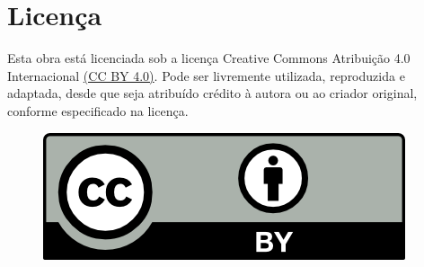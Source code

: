 \chapter{Licença}
Esta obra está licenciada sob a licença Creative Commons Atribuição 4.0 Internacional \href{https://creativecommons.org/licenses/by/4.0/deed.pt-br}{(CC BY 4.0)}. Pode ser livremente utilizada, reproduzida e adaptada, desde que seja atribuído crédito à autora ou ao criador original, conforme especificado na licença.
\begin{figure}[H]
    \centering
    \href{https://creativecommons.org/licenses/by/4.0/deed.pt-br}{\includegraphics{./includes/by.png}}
\end{figure}
